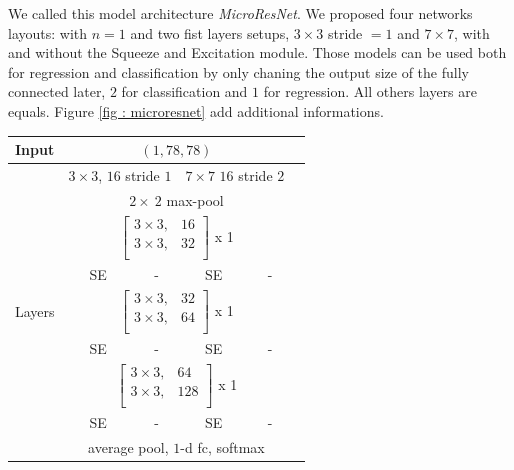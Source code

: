 \documentclass[../document.tex]{subfiles}
\begin{document}
We called this model architecture \emph{MicroResNet}. We proposed four networks layouts: with $n=1$ and two fist layers setups, $3\times3$ stride $=1$ and $7\times7$, with and without the Squeeze and Excitation module. Those models can be used both for regression and classification by only chaning the output size of the fully connected later, $2$ for classification and $1$ for regression. All others layers are equals. Figure \ref{fig : microresnet} add additional informations.
\begin{table}[htbp]
    \centering
        \begin{tabular}{@{}l|c|c|c|cc@{}}
        \hline
             Input   &  \multicolumn{4}{c}{$(1,78,78)$}  \\ 
            \hline 
            \multirow{12}{*}{Layers} & \multicolumn{2}{c}{$3 \times 3$, $16$ stride $1$} & \multicolumn{2}{c}{$7 \times 7$ $16$ stride $2$} \\
            \cline{2-5}
            &\multicolumn{4}{c}{$2 \times \ 2$ max-pool} \\ 
            \cline{2-5}
            &  \multicolumn{4}{c}{$\begin{bmatrix}
                3  \times 3, & 16 \\
                3  \times  3, & 32 \\  
               \end{bmatrix}$ x 1} \\ 
               \cline{2-5}
               &  SE & - & SE & -\\ 
               \cline{2-5}
               &  \multicolumn{4}{c}{$\begin{bmatrix}
                3  \times 3, & 32 \\
                3  \times  3, & 64 \\  
               \end{bmatrix}$ x 1} \\ 
               \cline{2-5}
               &  SE & - & SE & -\\ 
               \cline{2-5}

               &  \multicolumn{4}{c}{$\begin{bmatrix}
                3  \times 3, & 64 \\
                3  \times  3, & 128 \\  
               \end{bmatrix}$ x 1} \\
               \hline
               &  SE & - & SE & -\\ 
               \cline{2-5}
               &  \multicolumn{4}{c}{average pool, $1$-d fc, softmax} \\ 
               \hline
        

\end{tabular}
\end{table}
\end{document}
